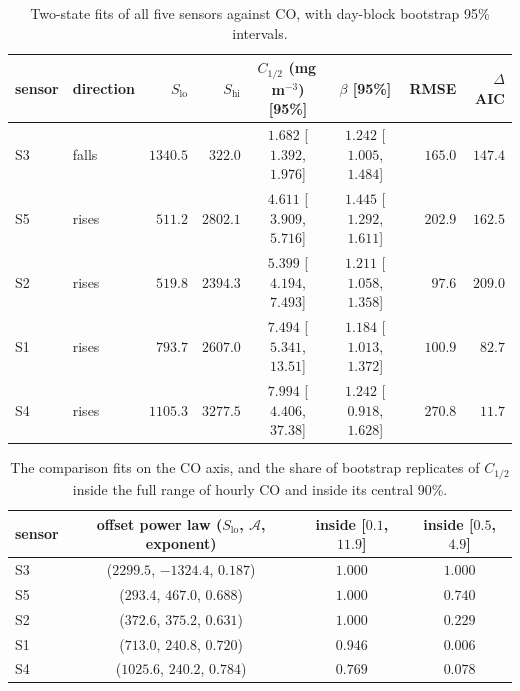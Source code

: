 \documentclass[11pt]{article}
\theoremstyle{definition}\newtheorem{definition}[theorem]{Definition}
\theoremstyle{remark}\newtheorem{remark}[theorem]{Remark}
\begin{document}
\begin{table}[htbp]\centering
\caption{Two-state fits of all five sensors against CO, with day-block bootstrap 95\% intervals.}\label{tab:ladder}
\footnotesize
\begin{tabular}{@{}llrrccrr@{}}\toprule
sensor & direction & $S_\mathrm{lo}$ & $S_\mathrm{hi}$ & $C_{1/2}$ (mg\,m$^{-3}$) [95\%] & $\beta$ [95\%] & RMSE & $\Delta$AIC\\\midrule
S3 & falls & $1340.5$ & $322.0$ & $\mathbf{1.682}$ [$1.392$, $1.976$] & $1.242$ [$1.005$, $1.484$] & $165.0$ & $147.4$\\
S5 & rises & $511.2$ & $2802.1$ & $\mathbf{4.611}$ [$3.909$, $5.716$] & $1.445$ [$1.292$, $1.611$] & $202.9$ & $162.5$\\
S2 & rises & $519.8$ & $2394.3$ & $\mathbf{5.399}$ [$4.194$, $7.493$] & $1.211$ [$1.058$, $1.358$] & $97.6$ & $209.0$\\
S1 & rises & $793.7$ & $2607.0$ & $\mathbf{7.494}$ [$5.341$, $13.51$] & $1.184$ [$1.013$, $1.372$] & $100.9$ & $82.7$\\
S4 & rises & $1105.3$ & $3277.5$ & $7.994$ [$4.406$, $37.38$] & $1.242$ [$0.918$, $1.628$] & $270.8$ & $11.7$\\\bottomrule
\end{tabular}
\end{table}

\begin{table}[htbp]\centering
\caption{The comparison fits on the CO axis, and the share of bootstrap replicates of $C_{1/2}$ inside the full range of hourly CO and inside its central 90\%.}\label{tab:ladder2}
\small
\begin{tabular}{@{}lccc@{}}\toprule
sensor & offset power law ($S_\mathrm{lo}$, $\mathcal A$, exponent) & inside [$0.1$, $11.9$] & inside [$0.5$, $4.9$]\\\midrule
S3 & ($2299.5$, $-1324.4$, $0.187$) & $1.000$ & $1.000$\\
S5 & ($293.4$, $467.0$, $0.688$) & $1.000$ & $0.740$\\
S2 & ($372.6$, $375.2$, $0.631$) & $1.000$ & $0.229$\\
S1 & ($713.0$, $240.8$, $0.720$) & $0.946$ & $0.006$\\
S4 & ($1025.6$, $240.2$, $0.784$) & $0.769$ & $0.078$\\\bottomrule
\end{tabular}
\end{table}
\end{document}

